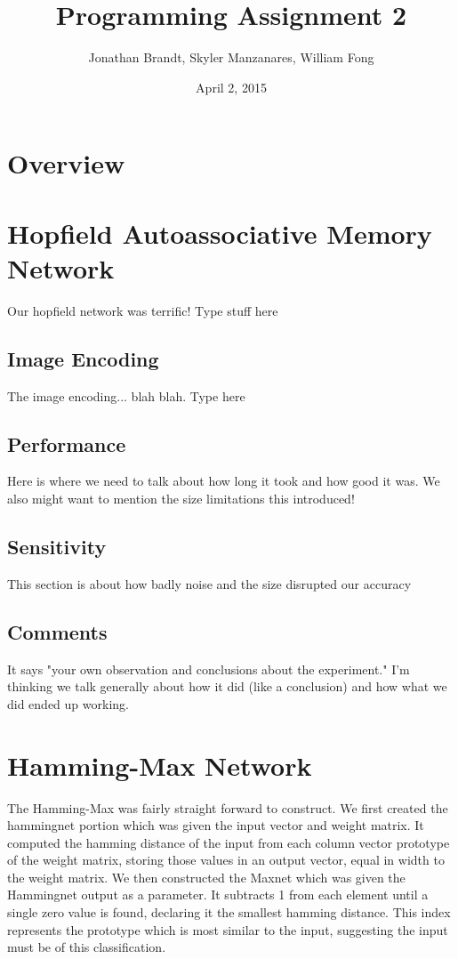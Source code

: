\documentclass{article}
\begin{document}
\author{Jonathan Brandt, Skyler Manzanares, William Fong}
\date{April 2, 2015}
\title{Programming Assignment 2}

\maketitle

\section{Overview}

\section{Hopfield Autoassociative Memory Network}
Our hopfield network was terrific! Type stuff here

\subsection{Image Encoding}
The image encoding... blah blah. Type here

\subsection{Performance}
Here is where we need to talk about how long it took and how good it was. We
also might want to mention the size limitations this introduced!

\subsection{Sensitivity}
This section is about how badly noise and the size disrupted our accuracy

\subsection{Comments}
It says "your own observation and conclusions about the experiment."
I'm thinking we talk generally about how it did (like a conclusion) and how
what we did ended up working.





\section{Hamming-Max Network}
The Hamming-Max was fairly straight forward to construct.  We first created the hammingnet portion which was given the input vector and weight matrix.  It computed the hamming distance of the input from each column vector prototype of the weight matrix, storing those values in an output vector, equal in width to the weight matrix.  We then constructed the Maxnet which was given the Hammingnet output as a parameter.  It subtracts 1 from each element until a single zero value is found, declaring it the smallest hamming distance.  This index represents the prototype which is most similar to the input, suggesting the input must be of this classification.
\end{document}
